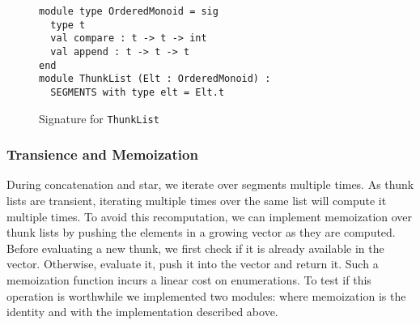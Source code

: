 
\begin{figure}[hbt]
  \centering
\begin{lstlisting}
module type OrderedMonoid = sig
  type t
  val compare : t -> t -> int
  val append : t -> t -> t
end
module ThunkList (Elt : OrderedMonoid) :
  SEGMENTS with type elt = Elt.t
\end{lstlisting}
  \caption{Signature for \texttt{ThunkList}}
  \label{code:thunklist}
\end{figure}

\subsubsection{Transience and Memoization}

During concatenation and star, we iterate over segments multiple times.
As thunk lists are transient, iterating multiple times over the same list
will compute it multiple times. To avoid this recomputation, we can implement memoization
over thunk lists by pushing the elements in a growing vector as they are
computed. Before evaluating a new thunk, we first check if it is already available
in the vector. Otherwise, evaluate it, push it into the vector and return it.
%
Such a memoization function incurs a linear cost on enumerations. To test
if this operation is worthwhile we implemented two modules:
 where memoization is the identity and 
with the implementation described above.

